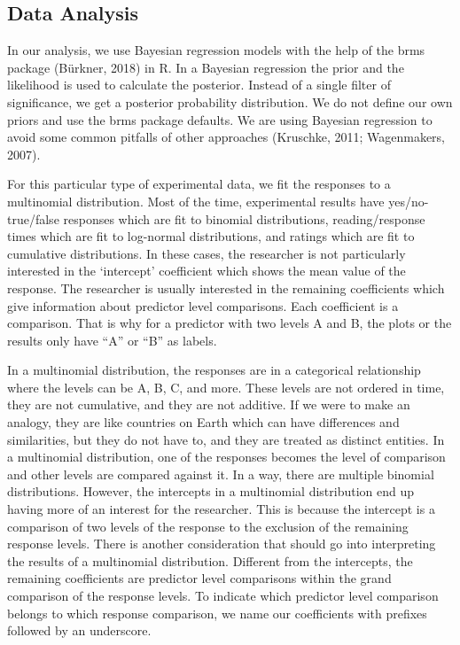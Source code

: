 \documentclass[]{elsarticle} %
\begin{document}
\hypertarget{data-analysis}{%
\subsection{Data Analysis}\label{data-analysis}}

In our analysis, we use Bayesian regression models with the help of the
brms package (Bürkner, 2018) in R. In a Bayesian regression the prior
and the likelihood is used to calculate the posterior. Instead of a
single filter of significance, we get a posterior probability
distribution. We do not define our own priors and use the brms package
defaults. We are using Bayesian regression to avoid some common pitfalls
of other approaches (Kruschke, 2011; Wagenmakers, 2007).

For this particular type of experimental data, we fit the responses to a
multinomial distribution. Most of the time, experimental results have
yes/no-true/false responses which are fit to binomial distributions,
reading/response times which are fit to log-normal distributions, and
ratings which are fit to cumulative distributions. In these cases, the
researcher is not particularly interested in the `intercept' coefficient
which shows the mean value of the response. The researcher is usually
interested in the remaining coefficients which give information about
predictor level comparisons. Each coefficient is a comparison. That is
why for a predictor with two levels A and B, the plots or the results
only have ``A'' or ``B'' as labels.

In a multinomial distribution, the responses are in a categorical
relationship where the levels can be A, B, C, and more. These levels are
not ordered in time, they are not cumulative, and they are not additive.
If we were to make an analogy, they are like countries on Earth which
can have differences and similarities, but they do not have to, and they
are treated as distinct entities. In a multinomial distribution, one of
the responses becomes the level of comparison and other levels are
compared against it. In a way, there are multiple binomial
distributions. However, the intercepts in a multinomial distribution end
up having more of an interest for the researcher. This is because the
intercept is a comparison of two levels of the response to the exclusion
of the remaining response levels. There is another consideration that
should go into interpreting the results of a multinomial distribution.
Different from the intercepts, the remaining coefficients are predictor
level comparisons within the grand comparison of the response levels. To
indicate which predictor level comparison belongs to which response
comparison, we name our coefficients with prefixes followed by an
underscore.
\end{document}
